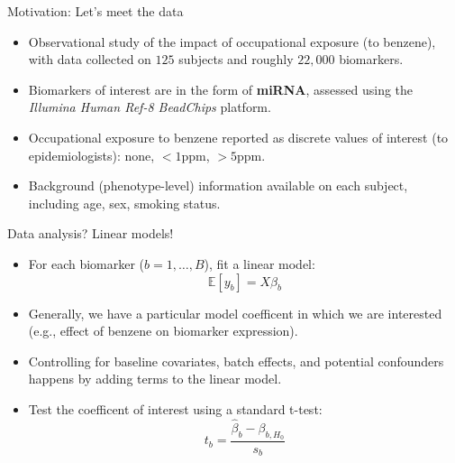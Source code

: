 \documentclass[12pt,t]{beamer}
\begin{document}
\begin{frame}[c]{Motivation: Let's meet the data}
\begin{center}
\begin{itemize}
  \itemsep12pt
  \item Observational study of the impact of occupational exposure (to benzene),
    with data collected on $125$ subjects and roughly $22,000$ biomarkers.
  \item Biomarkers of interest are in the form of \textbf{miRNA}, assessed
    using the \textit{Illumina Human Ref-8 BeadChips} platform.
  \item Occupational exposure to benzene reported as discrete values of
    interest (to epidemiologists): none, $<1$ppm, $>5$ppm.
  \item Background (phenotype-level) information available on each subject,
    including age, sex, smoking status.
\end{itemize}
\end{center}


\end{frame}



\begin{frame}[c]{Data analysis? Linear models!}
\begin{center}
\begin{itemize}
  \itemsep12pt
  \item For each biomarker ($b = 1, \dots, B$), fit a linear model:
    \[
    \mathbb{E}[y_b] = X \beta_b
    \]
  \item Generally, we have a particular model coefficent in which we are
    interested (e.g., effect of benzene on biomarker expression).
  \item Controlling for baseline covariates, batch effects, and potential
    confounders happens by adding terms to the linear model.
  \item Test the coefficent of interest using a standard t-test:
    \[
      t_{b} = \frac{\hat{\beta}_{b} - \beta_{b, H_0}}{s_b}
    \]
\end{itemize}
\end{center}


\end{frame}
\end{document}

